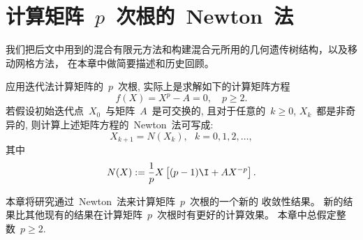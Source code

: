 

\chapter{计算矩阵~$p$~次根的~Newton~法}
\label{chapter:NM_MatrixRoot}

我们把后文中用到的混合有限元方法和构建混合元所用的几何遗传树结构，以及移动网格方法，
在本章中做简要描述和历史回顾。


应用迭代法计算矩阵的~$p$~次根, 实际上是求解如下的计算矩阵方程
\begin{equation}
\label{eq:f(X)=0} f(X) = X^p - A = 0, \quad p \geq 2.
\end{equation}
若假设初始迭代点~$X_0$~与矩阵~$A$~是可交换的, 且对于任意的~$k \geq
0$, $X_k$~都是非奇异的, 则计算上述矩阵方程的~Newton~法可写成:
\begin{equation}
\label{it:NM} X_{k+1}= N(X_k),\ \ \ k = 0,1,2,\ldots,
\end{equation}
其中
\begin{equation}
\label{it:NM_fun} N(X) := \frac{1}{p}X\left[(p-1)\I +
AX^{-p}\right].
\end{equation}


本章将研究通过~Newton~法来计算矩阵~$p$~次根的一个新的 收敛性结果。
新的结果比其他现有的结果在计算矩阵~$p$~次根时有更好的计算效果。
本章中总假定整数~$p \geq 2$.














